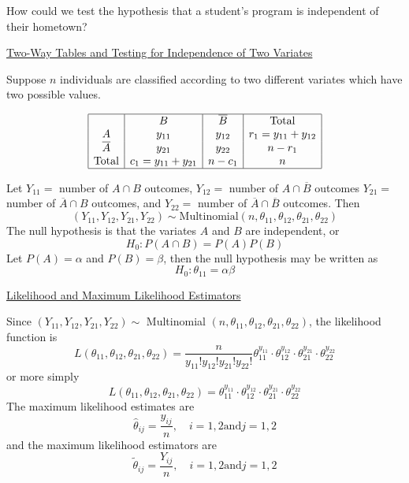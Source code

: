 \documentclass[oneside]{book}
\begin{document}
How could we test the hypothesis that a student's program is independent of their hometown?

\underline{Two-Way Tables and Testing for Independence of Two Variates}

Suppose $ n $ individuals are classified according to two different variates which have two possible values.

\[ \begin{array}{|c|c|c|c|}
        \hline       & B                   & \overline{B} & \text{Total}        \\
        A            & y_{11}              & y_{12}       & r_{1}=y_{11}+y_{12} \\
        \overline{A} & y_{21}              & y_{22}       & n-r_{1}             \\
        \text{Total} & c_{1}=y_{11}+y_{21} & n-c_{1}      & n                   \\
        \hline
    \end{array} \]

Let $Y_{11}=$ number of $A \cap B$ outcomes, $Y_{12}=$ number of $A \cap \overline{B}$ outcomes $Y_{21}=$ number of $\overline{A} \cap B$ outcomes, and $Y_{22}=$ number of $\overline{A} \cap \overline{B}$ outcomes.
Then
\[
    \left(Y_{11}, Y_{12}, Y_{21}, Y_{22}\right) \sim \text{Multinomial}\left(n, \theta_{11}, \theta_{12}, \theta_{21}, \theta_{22}\right)
\]
The null hypothesis is that the variates $A$ and $B$ are independent, or
\[
    H_{0}: P(A \cap B)=P(A) P(B)
\]
Let $P(A)=\alpha$ and $P(B)=\beta$, then the null hypothesis may be written as
\[
    H_{0}: \theta_{11}=\alpha \beta
\]

\underline{Likelihood and Maximum Likelihood Estimators}

Since $\left(Y_{11}, Y_{12}, Y_{21}, Y_{22}\right) \sim$ Multinomial $\left(n, \theta_{11}, \theta_{12}, \theta_{21}, \theta_{22}\right)$, the likelihood function is
\[
    L\left(\theta_{11}, \theta_{12}, \theta_{21}, \theta_{22}\right)=\frac{n}{y_{11} ! y_{12} ! y_{21} ! y_{22} !} \theta_{11}^{y_{11}} \cdot \theta_{12}^{y_{12}} \cdot \theta_{21}^{y_{21}} \cdot \theta_{22}^{y_{22}}
\]
or more simply
\[
    L\left(\theta_{11}, \theta_{12}, \theta_{21}, \theta_{22}\right)=\theta_{11}^{y_{11}} \cdot \theta_{12}^{y_{12}} \cdot \theta_{21}^{y_{21}} \cdot \theta_{22}^{y_{22}}
\]
The maximum likelihood estimates are
\[
    \hat{\theta}_{i j}=\frac{y_{i j}}{n}, \quad i=1,2 \text{and} j=1,2
\]
and the maximum likelihood estimators are
\[
    \tilde{\theta}_{i j}=\frac{Y_{i j}}{n}, \quad i=1,2 \text{and} j=1,2
\]
\end{document}
